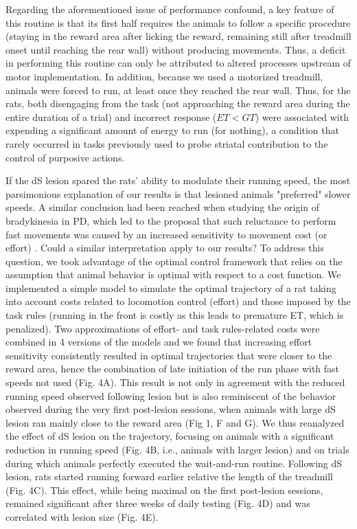Regarding the aforementioned issue of performance confound, a key feature of this routine is that its first half requires the animals to follow a specific procedure (staying in the reward area after licking the reward, remaining still after treadmill onset until reaching the rear wall) without producing movements. 
Thus, a deficit in performing this routine can only be attributed to altered processes upstream of motor implementation.
In addition, because we used a motorized treadmill, animals were forced to run, at least once they reached the rear wall.
Thus, for the rats, both disengaging from the task (not approaching the reward area during the entire duration of a trial) and incorrect response ($ET<GT$) were associated with expending a significant amount of energy to run (for nothing), a condition that rarely occurred in tasks previously used to probe striatal contribution to the control of purposive actions.
\par




\par
\par
If the dS lesion spared the rats' ability to modulate their running speed, the most parsimonious explanation of our results is that lesioned animals "preferred" slower speeds.
A similar conclusion had been reached when studying the origin of bradykinesia in PD, which led to the proposal that such reluctance to perform fast movements was caused by an increased sensitivity to movement cost (or effort) \cite{Mazzoni2007JN, Baraduc2013JN}.
Could a similar interpretation apply to our results?
To address this question, we took advantage of the optimal control framework that relies on the assumption that animal behavior is optimal with respect to a cost function.
We implemented a simple model to simulate the optimal trajectory of a rat taking into account costs related to locomotion control (effort) and those imposed by the task rules (running in the front is costly as this leads to premature ET, which is penalized).
Two approximations of effort- and task rules-related costs were combined in 4 versions of the models and we found that increasing effort sensitivity consistently resulted in optimal trajectories that were closer to the reward area, hence the combination of late initiation of the run phase with fast speeds not used (Fig. 4A).
This result is not only in agreement with the reduced running speed observed following lesion but is also reminiscent of the behavior observed during the very first post-lesion sessions, when animals with large dS lesion ran mainly close to the reward area (Fig 1, F and G). 
We thus reanalyzed the effect of dS lesion on the trajectory, focusing on animals with a significant reduction in running speed (Fig. 4B, i.e., animals with larger lesion) and on trials during which animals perfectly executed the wait-and-run routine.
Following dS lesion, rats started running forward earlier relative the length of the treadmill (Fig. 4C).
This effect, while being maximal on the first post-lesion sessions, remained significant after three weeks of daily testing (Fig. 4D) and was correlated with lesion size (Fig. 4E).








